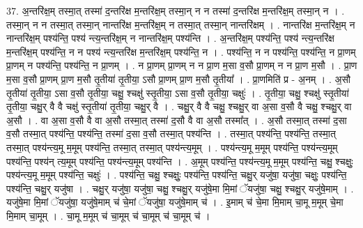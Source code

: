 \documentclass[17pt]{extarticle}
\begin{document}
37. अ॒न्तरि॑क्ष॒म् तस्मा॒त् तस्मा॑ द॒न्तरि॑क्ष म॒न्तरि॑क्ष॒म् तस्मा॒न् न न तस्मा॑ द॒न्तरि॑क्ष म॒न्तरि॑क्ष॒म् तस्मा॒न् न । . तस्मा॒न् न न तस्मा॒त् तस्मा॒न् नान्तरि॑क्ष म॒न्तरि॑क्ष॒म् न तस्मा॒त् तस्मा॒न् नान्तरि॑क्षम् । . नान्तरि॑क्ष म॒न्तरि॑क्ष॒म् न नान्तरि॑क्ष॒म् पश्य॑न्ति॒ पश्य॑ न्त्य॒न्तरि॑क्ष॒म् न नान्तरि॑क्ष॒म् पश्य॑न्ति । . अ॒न्तरि॑क्ष॒म् पश्य॑न्ति॒ पश्य॑ न्त्य॒न्तरि॑क्ष म॒न्तरि॑क्ष॒म् पश्य॑न्ति॒ न न पश्य॑ न्त्य॒न्तरि॑क्ष म॒न्तरि॑क्ष॒म् पश्य॑न्ति॒ न । . पश्य॑न्ति॒ न न पश्य॑न्ति॒ पश्य॑न्ति॒ न प्रा॒णम् प्रा॒णम् न पश्य॑न्ति॒ पश्य॑न्ति॒ न प्रा॒णम् । . न प्रा॒णम् प्रा॒णम् न न प्रा॒ण म॒सा व॒सौ प्रा॒णम् न न प्रा॒ण म॒सौ । . प्रा॒ण म॒सा व॒सौ प्रा॒णम् प्रा॒ण म॒सौ तृ॒तीया॑ तृ॒तीया॒ ऽसौ प्रा॒णम् प्रा॒ण म॒सौ तृ॒तीया᳚ । . प्रा॒णमिति॑ प्र - अ॒नम् । . अ॒सौ तृ॒तीया॑ तृ॒तीया॒ ऽसा व॒सौ तृ॒तीया॒ चक्षु॒ श्चक्षु॑ स्तृ॒तीया॒ ऽसा व॒सौ तृ॒तीया॒ चक्षुः॑ । . तृ॒तीया॒ चक्षु॒ श्चक्षु॑ स्तृ॒तीया॑ तृ॒तीया॒ चक्षु॒र् वै वै चक्षु॑ स्तृ॒तीया॑ तृ॒तीया॒ चक्षु॒र् वै । . चक्षु॒र् वै वै चक्षु॒ श्चक्षु॒र् वा अ॒सा व॒सौ वै चक्षु॒ श्चक्षु॒र् वा अ॒सौ । . वा अ॒सा व॒सौ वै वा अ॒सौ तस्मा॒त् तस्मा॑ द॒सौ वै वा अ॒सौ तस्मा᳚त् । . अ॒सौ तस्मा॒त् तस्मा॑ द॒सा व॒सौ तस्मा॒त् पश्य॑न्ति॒ पश्य॑न्ति॒ तस्मा॑ द॒सा व॒सौ तस्मा॒त् पश्य॑न्ति । . तस्मा॒त् पश्य॑न्ति॒ पश्य॑न्ति॒ तस्मा॒त् तस्मा॒त् पश्य॑न्त्य॒मू म॒मूम् पश्य॑न्ति॒ तस्मा॒त् तस्मा॒त् पश्य॑न्त्य॒मूम् । . पश्य॑न्त्य॒मू म॒मूम् पश्य॑न्ति॒ पश्य॑न्त्य॒मूम् पश्य॑न्ति॒ पश्य॑न् त्य॒मूम् पश्य॑न्ति॒ पश्य॑न्त्य॒मूम् पश्य॑न्ति । . अ॒मूम् पश्य॑न्ति॒ पश्य॑न्त्य॒मू म॒मूम् पश्य॑न्ति॒ चक्षु॒ श्चक्षुः॒ पश्य॑न्त्य॒मू म॒मूम् पश्य॑न्ति॒ चक्षुः॑ । . पश्य॑न्ति॒ चक्षु॒ श्चक्षुः॒ पश्य॑न्ति॒ पश्य॑न्ति॒ चक्षु॒र् यजु॑षा॒ यजु॑षा॒ चक्षुः॒ पश्य॑न्ति॒ पश्य॑न्ति॒ चक्षु॒र् यजु॑षा । . चक्षु॒र् यजु॑षा॒ यजु॑षा॒ चक्षु॒ श्चक्षु॒र् यजु॑षे॒मा मि॒मां ॅयजु॑षा॒ चक्षु॒ श्चक्षु॒र् यजु॑षे॒माम् । . यजु॑षे॒मा मि॒मां ॅयजु॑षा॒ यजु॑षे॒माम् च॑ चे॒मां ॅयजु॑षा॒ यजु॑षे॒माम् च॑ । . इ॒माम् च॑ चे॒मा मि॒माम् चा॒मू म॒मूम् चे॒मा मि॒माम् चा॒मूम् । . चा॒मू म॒मूम् च॑ चा॒मूम् च॑ चा॒मूम् च॑ चा॒मूम् च॑ । \newline
\pagebreak
{}
\end{document}
